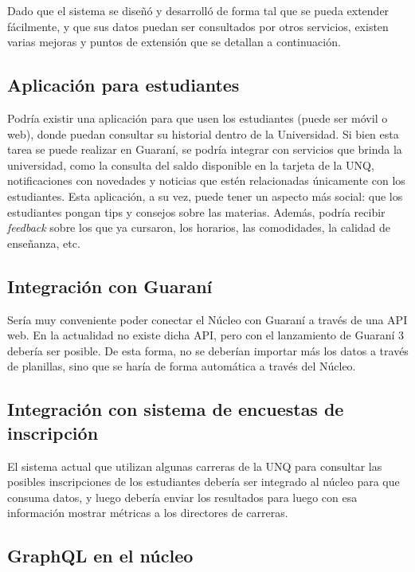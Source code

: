 Dado que el sistema se diseñó y desarrolló de forma tal que se pueda extender fácilmente, y que sus datos puedan ser consultados por otros servicios, existen varias mejoras y puntos de extensión que se detallan a continuación.

\subsection[Aplicación para estudiantes]{Aplicación para estudiantes}

Podría existir una aplicación para que usen los estudiantes (puede ser móvil o web), donde puedan consultar su historial dentro de la Universidad. Si bien esta tarea se puede realizar en Guaraní, se podría integrar con servicios que brinda la universidad, como la consulta del saldo disponible en la tarjeta de la UNQ, notificaciones con novedades y noticias que estén relacionadas únicamente con los estudiantes.
Esta aplicación, a su vez, puede tener un aspecto más social: que los estudiantes pongan tips y consejos sobre las materias.
Además, podría recibir \textit{feedback} sobre los que ya cursaron, los horarios, las comodidades, la calidad de enseñanza, etc.

\subsection[Integración con Guaraní]{Integración con Guaraní}

Sería muy conveniente poder conectar el Núcleo con Guaraní a través de una API web. En la actualidad no existe dicha API, pero con el lanzamiento de Guaraní 3 debería ser posible. De esta forma, no se deberían importar más los datos a través de planillas, sino que se haría de forma automática a través del Núcleo.

\subsection[Integración con sistema de encuestas de inscripción]{Integración con sistema de encuestas de inscripción}

El sistema actual que utilizan algunas carreras de la UNQ para consultar las posibles inscripciones de los estudiantes debería ser integrado al núcleo para que consuma datos, y luego debería enviar los resultados para luego con esa información mostrar métricas a los directores de carreras. 


\subsection[GraphQL en el núcleo]{GraphQL en el núcleo}

